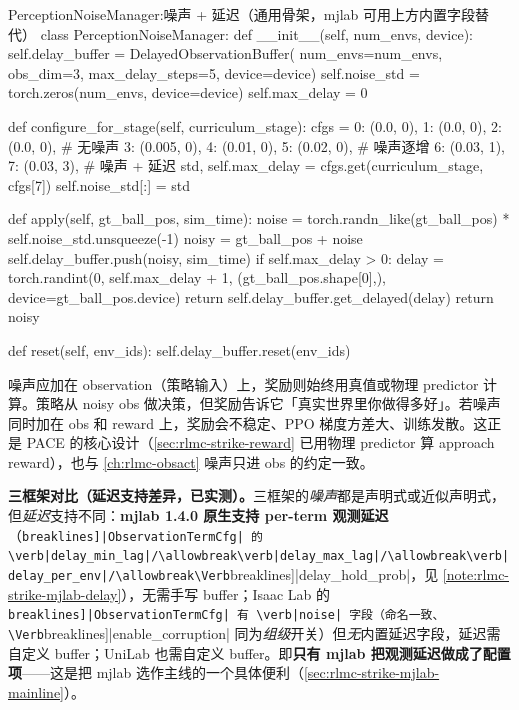 \begin{codebox}[Python]{PerceptionNoiseManager:噪声 + 延迟（通用骨架，mjlab 可用上方内置字段替代）}
class PerceptionNoiseManager:
    def __init__(self, num_envs, device):
        self.delay_buffer = DelayedObservationBuffer(
            num_envs=num_envs, obs_dim=3, max_delay_steps=5, device=device)
        self.noise_std = torch.zeros(num_envs, device=device)
        self.max_delay = 0

    def configure_for_stage(self, curriculum_stage):
        cfgs = {
            0: (0.0, 0), 1: (0.0, 0), 2: (0.0, 0),      # 无噪声
            3: (0.005, 0), 4: (0.01, 0), 5: (0.02, 0),  # 噪声逐增
            6: (0.03, 1), 7: (0.03, 3),                 # 噪声 + 延迟
        }
        std, self.max_delay = cfgs.get(curriculum_stage, cfgs[7])
        self.noise_std[:] = std

    def apply(self, gt_ball_pos, sim_time):
        noise = torch.randn_like(gt_ball_pos) * self.noise_std.unsqueeze(-1)
        noisy = gt_ball_pos + noise
        self.delay_buffer.push(noisy, sim_time)
        if self.max_delay > 0:
            delay = torch.randint(0, self.max_delay + 1,
                                  (gt_ball_pos.shape[0],), device=gt_ball_pos.device)
            return self.delay_buffer.get_delayed(delay)
        return noisy

    def reset(self, env_ids):
        self.delay_buffer.reset(env_ids)
\end{codebox}

\begin{insight}\label{ins:rlmc-strike-noise-reward}
噪声应加在 observation（策略输入）上，奖励则始终用真值或物理 predictor 计算。策略从 noisy obs 做决策，但奖励告诉它「真实世界里你做得多好」。若噪声同时加在 obs 和 reward 上，奖励会不稳定、PPO 梯度方差大、训练发散。这正是 PACE 的核心设计（\cref{sec:rlmc-strike-reward} 已用物理 predictor 算 approach reward），也与 \cref{ch:rlmc-obsact} 噪声只进 obs 的约定一致。
\end{insight}

\textbf{三框架对比（延迟支持差异，已实测）。}三框架的\emph{噪声}都是声明式或近似声明式，但\emph{延迟}支持不同：\textbf{mjlab 1.4.0 原生支持 per-term 观测延迟}（\Verb[breaklines]|ObservationTermCfg| 的 \verb|delay_min_lag|/\allowbreak\verb|delay_max_lag|/\allowbreak\verb|delay_per_env|/\allowbreak\Verb[breaklines]|delay_hold_prob|，见 \cref{note:rlmc-strike-mjlab-delay}），无需手写 buffer；Isaac Lab 的 \Verb[breaklines]|ObservationTermCfg| 有 \verb|noise| 字段（命名一致、\Verb[breaklines]|enable_corruption| 同为\emph{组级}开关）但\emph{无}内置延迟字段，延迟需自定义 buffer；UniLab 也需自定义 buffer。即\textbf{只有 mjlab 把观测延迟做成了配置项}——这是把 mjlab 选作主线的一个具体便利（\cref{sec:rlmc-strike-mjlab-mainline}）。

